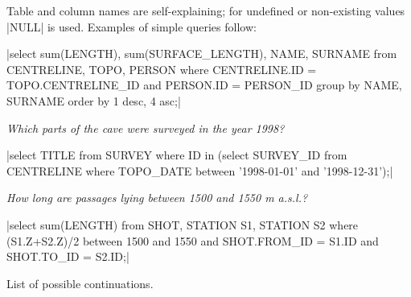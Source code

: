 \midinsert
  \ifx\pdfoutput\undefined\else
    \centerline{\pdfrefximage\pdflastximage}%
  \fi
\endinsert


Table and column names are self-explaining; for undefined or non-existing 
values |NULL| is used. Examples of simple queries follow:


|select sum(LENGTH), sum(SURFACE_LENGTH), NAME, SURNAME 
  from CENTRELINE, TOPO, PERSON 
  where CENTRELINE.ID = TOPO.CENTRELINE_ID and PERSON.ID = PERSON_ID 
  group by NAME, SURNAME order by 1 desc, 4 asc;|

{\it Which parts of the cave were surveyed in the year 1998?}

|select TITLE from SURVEY where ID in 
  (select SURVEY_ID from CENTRELINE 
  where TOPO_DATE between '1998-01-01' and '1998-12-31');|

{\it How long are passages lying between 1500 and 1550 m a.s.l.?}

|select sum(LENGTH) from SHOT, STATION S1, STATION S2 
  where (S1.Z+S2.Z)/2 between 1500 and 1550 and 
  SHOT.FROM_ID = S1.ID and SHOT.TO_ID = S2.ID;|

\subsubchapter List of possible continuations.


